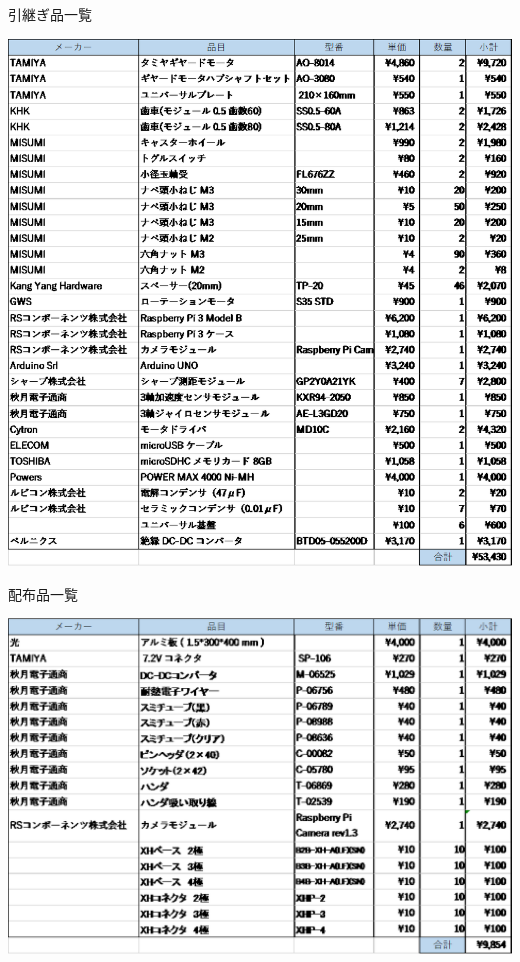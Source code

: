 \documentclass[11pt,a4]{jsarticle}
\begin{document}
  \begin{table}[h]
    \centering
    \caption{引継ぎ品一覧}
    \includegraphics[width=1.0\hsize]{picture/items_inherited.eps}
  \end{table}

  \begin{table}[h]
    \centering
    \caption{配布品一覧}
    \includegraphics[width=1.0\hsize]{picture/items_distributed.eps}
  \end{table}
\end{document}
